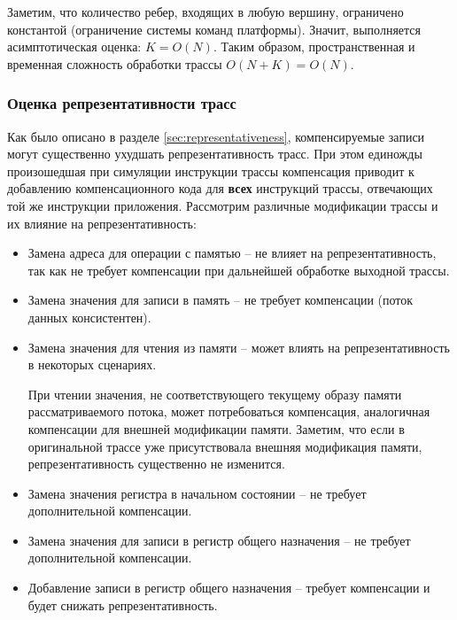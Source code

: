 Заметим, что количество ребер, входящих в любую вершину, ограничено константой (ограничение системы команд платформы). Значит, выполняется асимптотическая оценка: $K = O(N)$. Таким образом, пространственная и временная сложность обработки трассы $O(N + K) = O(N)$.

\subsubsection{Оценка репрезентативности трасс}

Как было описано в разделе \ref{sec:representativeness}, компенсируемые записи могут существенно ухудшать репрезентативность трасс. При этом единожды произошедшая при симуляции инструкции трассы компенсация приводит к добавлению компенсационного кода для \textbf{всех} инструкций трассы, отвечающих той же инструкции приложения. Рассмотрим различные модификации трассы и их влияние на репрезентативность:

\begin{itemize}
    \item Замена адреса для операции с памятью -- не влияет на репрезентативность, так как не требует компенсации при дальнейшей обработке выходной трассы.

    \item Замена значения для записи в память -- не требует компенсации (поток данных консистентен).

    \item Замена значения для чтения из памяти -- может влиять на репрезентативность в некоторых сценариях.

    При чтении значения, не соответствующего текущему образу памяти рассматриваемого потока, может потребоваться компенсация, аналогичная компенсации для внешней модификации памяти. Заметим, что если в оригинальной трассе уже присутствовала внешняя модификация памяти, репрезентативность существенно не изменится.

    \item Замена значения регистра в начальном состоянии -- не требует дополнительной компенсации.

    \item Замена значения для записи в регистр общего назначения -- не требует дополнительной компенсации.

    \item Добавление записи в регистр общего назначения -- требует компенсации и будет снижать репрезентативность.
\end{itemize}


